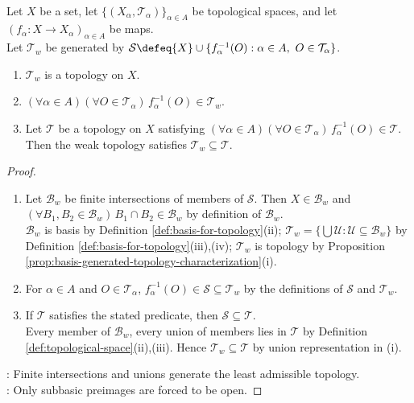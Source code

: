 \begin{proposition} \label{prop:weak-topology-universal-property} \\
Let $X$ be a set, let $\{(X_\alpha,\mathcal{T}_\alpha)\}_{\alpha\in A}$ be topological spaces, and let $(f_\alpha:X\to X_\alpha)_{\alpha\in A}$ be maps.\\
Let $\mathcal{T}_w$ be generated by $\mathcal{S}\defeq\{X\}\cup\{f_\alpha^{-1}(O):\alpha\in A,\ O\in\mathcal{T}_\alpha\}$.\\
\begin{enumerate}[label=(\roman*)]
\setlength{\itemsep}{0pt}
\item $\mathcal{T}_w$ is a topology on $X$.
\item $(\forall\alpha\in A)(\forall O\in\mathcal{T}_\alpha)\,f_\alpha^{-1}(O)\in\mathcal{T}_w$.
\item Let $\mathcal{T}$ be a topology on $X$ satisfying $(\forall\alpha\in A)(\forall O\in\mathcal{T}_\alpha)\,f_\alpha^{-1}(O)\in\mathcal{T}$. Then the weak topology satisfies $\mathcal{T}_w\subseteq\mathcal{T}$.
\end{enumerate}
\begin{proof}
\begin{enumerate}[label=(\roman*)]
\setlength{\itemsep}{0pt}
\item Let $\mathcal{B}_w$ be finite intersections of members of $\mathcal{S}$. Then $X\in\mathcal{B}_w$ and $(\forall B_1,B_2\in\mathcal{B}_w)\,B_1\cap B_2\in\mathcal{B}_w$ by definition of $\mathcal{B}_w$.\\
$\mathcal{B}_w$ is basis by Definition \ref{def:basis-for-topology}(ii); $\mathcal{T}_w=\{\bigcup\mathcal{U}:\mathcal{U}\subseteq\mathcal{B}_w\}$ by Definition \ref{def:basis-for-topology}(iii),(iv); $\mathcal{T}_w$ is topology by Proposition \ref{prop:basis-generated-topology-characterization}(i).
\item For $\alpha\in A$ and $O\in\mathcal{T}_\alpha$, $f_\alpha^{-1}(O)\in\mathcal{S}\subseteq\mathcal{T}_w$ by the definitions of $\mathcal{S}$ and $\mathcal{T}_w$.
\item If $\mathcal{T}$ satisfies the stated predicate, then $\mathcal{S}\subseteq\mathcal{T}$.\\
Every member of $\mathcal{B}_w$, every union of members lies in $\mathcal{T}$ by Definition \ref{def:topological-space}(ii),(iii). Hence $\mathcal{T}_w\subseteq\mathcal{T}$ by union representation in (i).
\end{enumerate}
: Finite intersections and unions generate the least admissible topology.\\
: Only subbasic preimages are forced to be open.
\end{proof}
\end{proposition}
